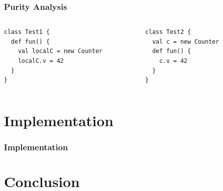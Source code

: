 \documentclass[hyperref={pdfpagelabels=false}]{beamer}
\begin{document}
\begin{frame}[fragile]
    \frametitle{Purity Analysis}
    \begin{columns}
      \begin{column}{0.4\textwidth}
\begin{lstlisting}
class Test1 {
  def fun() {
    val localC = new Counter
    localC.v = 42
  }
}
\end{lstlisting}
      \end{column}
      \begin{column}{0.6\textwidth}
\begin{lstlisting}
class Test2 {
  val c = new Counter
  def fun() {
    c.v = 42
  }
}
\end{lstlisting}
      \end{column}
    \end{columns}
\end{frame}

\section{Implementation}
\begin{frame}
    \frametitle{Implementation}
\end{frame}

\section{Conclusion}
\end{document}
